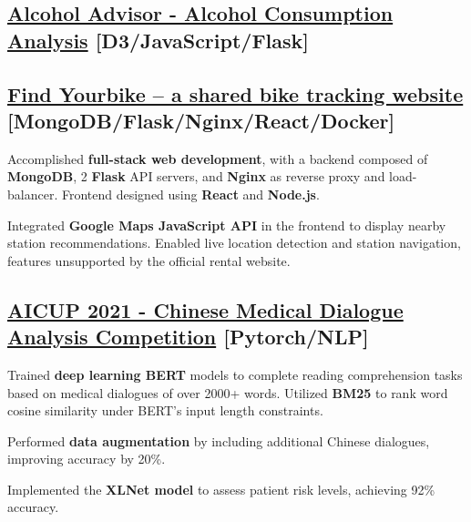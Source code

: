 
% 
%
%
%
%
\subsection{{\href{https://youtu.be/KBbZNMYVIL0?si=ItX2DTpUf9Rqttcg}{Alcohol Advisor - Alcohol Consumption Analysis} \hfill [D3/JavaScript/Flask]}}
\vspace{9pt}
\subsection{{\href{https://github.com/nba556677go/cloud_computing2020/tree/main/final}{Find Yourbike – a shared bike tracking website} \hfill [MongoDB/Flask/Nginx/React/Docker]}}
\begin{zitemize}
\item Accomplished \textbf{full-stack web development}, with a backend composed of \textbf{MongoDB}, 2 \textbf{Flask} API servers, and \textbf{Nginx} as reverse proxy and load-balancer. Frontend designed using \textbf{React} and \textbf{Node.js}.
\item Integrated \textbf{Google Maps JavaScript API} in the frontend to display nearby station recommendations. Enabled live location detection and station navigation, features unsupported by the official rental website.
\end{zitemize}
\subsection{{\href{https://github.com/mhjuan/AICUP2021-Chinese-Dialogue-Comprehension}{AICUP 2021 - Chinese Medical Dialogue Analysis Competition} \hfill [Pytorch/NLP]}}
\begin{zitemize}
\item Trained \textbf{deep learning BERT} models to complete reading comprehension tasks based on medical dialogues of over 2000+ words. Utilized \textbf{BM25} to rank word cosine similarity under BERT’s input length constraints.
\item Performed \textbf{data augmentation} by including additional Chinese dialogues, improving accuracy by 20\%.
\item Implemented the \textbf{XLNet model} to assess patient risk levels, achieving 92\% accuracy.
\end{zitemize}

